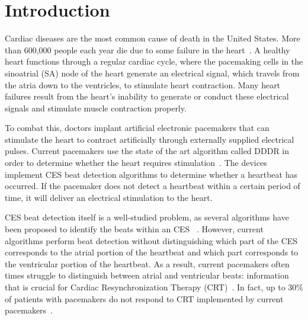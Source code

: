 \documentclass[conference]{IEEEtran}
\begin{document}




%
\IEEEpeerreviewmaketitle



\section{Introduction}
Cardiac diseases are the most common cause of death in
the United States. More than 600,000 people each year
die due to some failure in the heart~\cite{death-stats}. A healthy heart
functions through a regular cardiac cycle, where the pacemaking cells
in the sinoatrial (SA) node of the heart
generate an electrical signal, which travels from the atria
down to the ventricles, to stimulate heart contraction.
Many heart failures result from the heart's inability to
generate or conduct these electrical signals and stimulate
muscle contraction properly.

To combat this, doctors implant artificial electronic pacemakers
that can stimulate the heart
to contract artificially through externally supplied
electrical pulses.
Current pacemakers use the state of the art
algorithm called DDDR in order to determine whether
the heart requires stimulation~\cite{basic-pacing}.
The devices implement
CES beat detection algorithms to determine whether a
heartbeat has occurred. If the pacemaker does not detect a heartbeat
within a certain period of time, it will deliver an
electrical stimulation to the heart.

CES beat detection itself is a well-studied problem, as
several algorithms have been proposed to identify the
beats within an CES ~\cite{realtime-qrs, ecg-filter}. However, current
algorithms perform beat detection without distinguishing
which part of the CES corresponds to the atrial
portion of the heartbeat and which part corresponds to
the ventricular portion of the heartbeat. As a result,
current pacemakers often times struggle to distinguish
between atrial and ventricular beats: information that is
crucial for Cardiac Resynchronization Therapy (CRT)~\cite{multisite-crt}.
In fact, up to 30\% of patients with pacemakers do
not respond to CRT implemented by current pacemakers~\cite{multisite-crt}.
\end{document}
